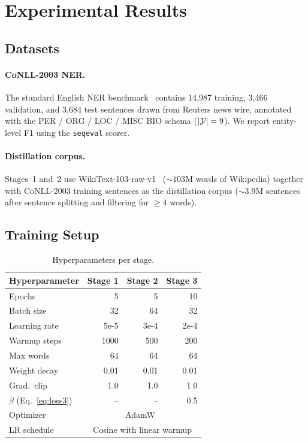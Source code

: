 \section{Experimental Results}
\label{sec:experiments}

\subsection{Datasets}

\paragraph{CoNLL-2003 NER.}
The standard English NER benchmark~\citep{tjong2003conll} contains 14,987
training, 3,466 validation, and 3,684 test sentences drawn from Reuters news
wire, annotated with the PER / ORG / LOC / MISC BIO schema ($|\mathcal{Y}|=9$).
We report entity-level F1 using the \texttt{seqeval} scorer.

\paragraph{Distillation corpus.}
Stages~1 and~2 use WikiText-103-raw-v1~\citep{merity2017pointer}
(${\sim}103$M words of Wikipedia) together with CoNLL-2003 training sentences
as the distillation corpus (${\sim}3.9$M sentences after sentence splitting and
filtering for $\geq 4$ words).

\subsection{Training Setup}

\begin{table}[h]
\centering
\caption{Hyperparameters per stage.}
\label{tab:hparams}
\begin{tabular}{lrrr}
\toprule
\textbf{Hyperparameter} & \textbf{Stage 1} & \textbf{Stage 2} & \textbf{Stage 3} \\
\midrule
Epochs          & 5     & 5     & 10    \\
Batch size      & 32    & 64    & 32    \\
Learning rate   & 5e-5  & 3e-4  & 2e-4  \\
Warmup steps    & 1000  & 500   & 200   \\
Max words       & 64    & 64    & 64    \\
Weight decay    & 0.01  & 0.01  & 0.01  \\
Grad.\ clip     & 1.0   & 1.0   & 1.0   \\
$\beta$ (Eq.~\ref{eq:loss3}) & -- & -- & 0.5 \\
Optimizer       & \multicolumn{3}{c}{AdamW~\citep{loshchilov2019decoupled}} \\
LR schedule     & \multicolumn{3}{c}{Cosine with linear warmup} \\
\bottomrule
\end{tabular}
\end{table}

